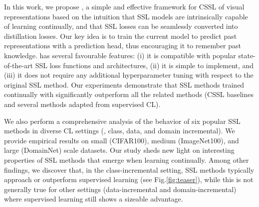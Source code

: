 In this work, we propose \name{}, a simple and effective framework for CSSL of visual representations based on the intuition that SSL models are intrinsically capable of learning continually, and that SSL losses can be seamlessly converted into distillation losses. Our key idea is to train the current model to predict past representations with
a prediction head, thus encouraging it to remember past knowledge. \name{} has several favourable features: (i) it is compatible with popular state-of-the-art SSL loss functions and architectures, (ii) it is simple to implement, and (iii) it does not require any additional hyperparameter tuning with respect to the original SSL method. Our experiments demonstrate that SSL methods trained continually with \name{} significantly outperform all the related methods (CSSL baselines and several methods adapted from supervised CL).

We also perform a comprehensive analysis of the behavior of six popular SSL methods in diverse CL settings (\ie, class, data, and domain incremental). We provide empirical results on small (CIFAR100), medium (ImageNet100), and large (DomainNet) scale datasets. 
Our study sheds new light on interesting properties of SSL methods that emerge when learning continually.
Among other findings, we discover that, in the class-incremental setting, SSL methods typically approach or outperform supervised learning (see Fig.\ref{fig:teaser}), while this is not generally true for other settings (data-incremental and domain-incremental) where supervised learning still shows a sizeable advantage.
